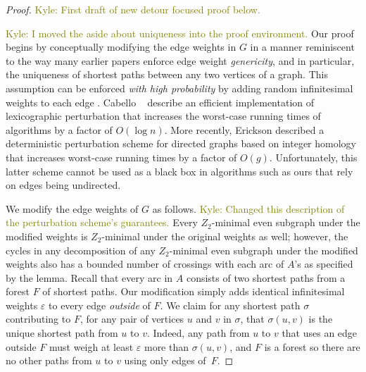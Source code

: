 \documentclass[letterpaper,review]{siamart190516}
\let\eps\varepsilon
\def\knote#1{\textcolor{olive}{Kyle: #1}}
\begin{document}
\begin{proof}
\knote{First draft of new detour focused proof below.}

\knote{I moved the aside about uniqueness into the proof environment.}
Our proof begins by conceptually modifying the edge weights in $G$ in a manner reminiscent to the
way many earlier papers \cite{cce-msspe-13, benw-amcnt-16, mnnw-mdpgo-18, bsw-msopg-15, e-pspmf-10,
eh-ocsd-04} enforce edge weight \emph{genericity}, and in particular, the uniqueness of shortest
paths between any two vertices of a graph.
This assumption can be enforced \emph{with high probability} by adding random infinitesimal weights
to each edge \cite{mvv-memi-87}.
Cabello \etal~\cite{cce-msspe-13} describe an efficient
implementation of lexicographic perturbation \cite{c-odlp-52,dow-gsmml-55,hm-apmcb-94} that
increases the worst-case running times of algorithms by a factor of $O(\log n)$.
More recently, Erickson \etal \cite{efl-hmcpf-18} described a deterministic perturbation scheme for
directed graphs based on integer homology that increases worst-case running times by a factor of
$O(g)$.
Unfortunately, this latter scheme cannot be used as a black box in algorithms such as ours that rely
on edges being undirected.

We modify the edge weights of $G$ as follows.
\knote{Changed this description of the perturbation scheme's guarantees.}
Every \(Z_2\)-minimal even subgraph under the modified weights is \(Z_2\)-minimal under the original
weights as well;
however, the cycles in any decomposition of any \(Z_2\)-minimal even subgraph under the modified
weights also has a bounded number of crossings with each arc of \(A\)'s as specified by the lemma.
%
Recall that every arc in $A$ consists of two shortest paths from a forest $F$ of shortest paths.
Our modification simply adds identical infinitesimal weights $\eps$ to every edge \emph{outside} of
$F$.
We claim for any shortest path $\sigma$ contributing to $F$, for any pair of vertices $u$ and $v$
in $\sigma$, that $\sigma(u, v)$ is the unique shortest path from $u$ to $v$.
Indeed, any path from $u$ to $v$ that uses an edge outside $F$ must weigh at least $\eps$ more than
$\sigma(u, v)$, and $F$ is a forest so there are no other paths from $u$ to $v$ using only edges of~$F$.


\end{proof}
\end{document}

